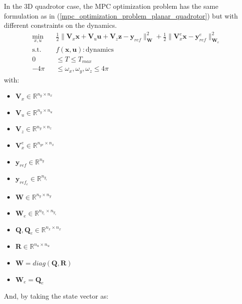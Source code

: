\documentclass{thesisreport}
\begin{document}
In the 3D quadrotor case, the MPC optimization problem has the same formulation as in (\ref{mpc_optimization_problem_planar_quadrotor})
but with different constraints on the dynamics.
	\begin{equation}\label{mpc_optimization_problem_3d_quadrotor}
\begin{aligned}
            \min_{x,u} \quad & \frac{1}{2}\|\bm{V}_x \bm{x} + \bm{V}_u \bm{u} + \bm{V}_z \bm{z} - \bm{y}_{ref}\|^2_{\bm{W}} + \frac{1}{2}\|\bm{V}_x^e \bm{x} - \bm{y}_{ref}^e \|^2_{\bm{W}_e} \\
            \textrm{s.t.} \quad & f(\bm{x},\bm{u}):\text{dynamics} \\
             0 &\leq T \leq T_{max} \\
             -4 \pi &\leq \omega_x, \omega_y, \omega_z \leq 4 \pi
        \end{aligned}
\end{equation}
with: 
\begin{multicols}{3}
\begin{itemize}
	\item $\bm{V}_x \in \mathbb{R}^{n_y \times n_x}$
	\item $\bm{V}_u \in \mathbb{R}^{n_y \times n_u}$ 
	\item $\bm{V}_z \in \mathbb{R}^{n_y \times n_z}$
	\item $\bm{V}_x^e \in \mathbb{R}^{n_{ye}\times n_x}$
\end{itemize}
\columnbreak
\begin{itemize}
	\item $\bm{y}_{ref} \in \mathbb{R}^{n_y}$
	\item $\bm{y}_{ref_e} \in \mathbb{R}^{n_{y_e}}$
	\item $\bm{W} \in \mathbb{R}^{n_y \times n_y}$
	\item $\bm{W}_e \in \mathbb{R}^{n_{y_e} \times n_{y_e}}$
\end{itemize}
\columnbreak
\begin{itemize}
	\item $\bm{Q},\bm{Q}_e \in \mathbb{R}^{n_x \times n_x}$
	\item $\bm{R} \in \mathbb{R}^{n_u \times n_u}$
	\item $\bm{W} = diag(\bm{Q},\bm{R}) $
	\item $\bm{W}_e = \bm{Q}_e $
\end{itemize}
\end{multicols}

And, by taking the state vector as:
\end{document}
